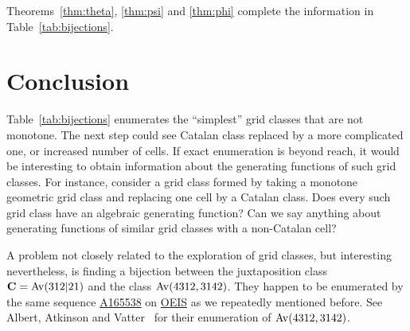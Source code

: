 Theorems~\ref{thm:theta}, \ref{thm:psi} and \ref{thm:phi} complete the information in Table~\ref{tab:bijections}.

\section{Conclusion}
\label{sec:conclusion}

Table~\ref{tab:bijections} enumerates the ``simplest'' grid classes that are not monotone. The next step could see Catalan class replaced by a more complicated one, or increased number of cells. If exact enumeration is beyond reach, it would be interesting to obtain information about the generating functions of such grid classes. For instance, consider a grid class formed by taking a monotone geometric grid class and replacing one cell by a Catalan class. Does every such grid class have an algebraic generating function? Can we say anything about generating functions of similar grid classes with a non-Catalan cell?

A problem not closely related to the exploration of grid classes, but interesting nevertheless, is finding a bijection between the juxtaposition class $\mathbf{C} = \mathrm{Av}(312|21)$ and the class $\mathrm{Av}(4312, 3142)$. They happen to be enumerated by the same sequence \href{http://oeis.org/A165538}{A165538} on \href{http://oeis.org}{OEIS} as we repeatedly mentioned before. See Albert, Atkinson and Vatter~\cite{albert2012inflations} for their enumeration of $\mathrm{Av}(4312, 3142)$. 




